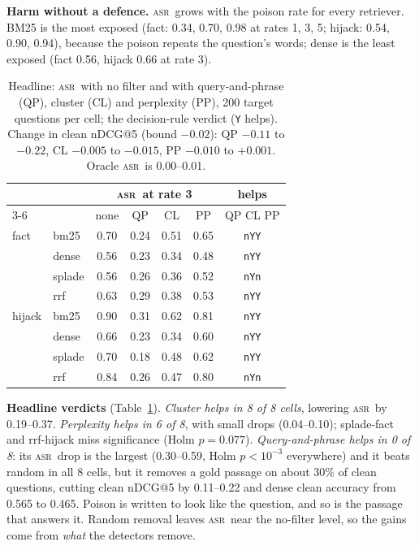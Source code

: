 \documentclass[10pt,a4paper,twocolumn]{article}
\makeatletter
\renewcommand\section{\@startsection{section}{1}{\z@}{-1.6ex plus -.4ex}{0.6ex}{\normalfont\large\bfseries}}
\newcommand{\asr}{\textsc{asr}}
\makeatother
\begin{document}
\section{Results}
\textbf{Harm without a defence.} \asr\ grows with the poison rate for every retriever. BM25 is the most exposed (fact: 0.34, 0.70, 0.98 at rates 1, 3, 5; hijack: 0.54, 0.90, 0.94), because the poison repeats the question's words; dense is the least exposed (fact 0.56, hijack 0.66 at rate 3).

\begin{table}[t]\centering\footnotesize
\setlength{\tabcolsep}{2.6pt}
\begin{tabular}{@{}llccccc@{}}
\toprule
 & & \multicolumn{4}{c}{\asr\ at rate 3} & helps \\
\cmidrule(lr){3-6}
 & & none & QP & CL & PP & \small QP CL PP \\
\midrule
fact & bm25 & 0.70 & 0.24 & 0.51 & 0.65 & \texttt{nYY} \\
 & dense & 0.56 & 0.23 & 0.34 & 0.48 & \texttt{nYY} \\
 & splade & 0.56 & 0.26 & 0.36 & 0.52 & \texttt{nYn} \\
 & rrf & 0.63 & 0.29 & 0.38 & 0.53 & \texttt{nYY} \\
\midrule
hijack & bm25 & 0.90 & 0.31 & 0.62 & 0.81 & \texttt{nYY} \\
 & dense & 0.66 & 0.23 & 0.34 & 0.60 & \texttt{nYY} \\
 & splade & 0.70 & 0.18 & 0.48 & 0.62 & \texttt{nYY} \\
 & rrf & 0.84 & 0.26 & 0.47 & 0.80 & \texttt{nYn} \\
\bottomrule
\end{tabular}
\caption{Headline: \asr\ with no filter and with query-and-phrase (QP), cluster (CL) and perplexity (PP), 200 target questions per cell; the decision-rule verdict (\texttt{Y} helps). Change in clean nDCG@5 (bound $-0.02$): QP $-0.11$ to $-0.22$, CL $-0.005$ to $-0.015$, PP $-0.010$ to $+0.001$. Oracle \asr\ is 0.00--0.01.}\label{tab:headline}
\end{table}

\textbf{Headline verdicts} (Table~\ref{tab:headline}). \emph{Cluster helps in 8 of 8 cells}, lowering \asr\ by 0.19--0.37. \emph{Perplexity helps in 6 of 8}, with small drops (0.04--0.10); splade-fact and rrf-hijack miss significance (Holm $p=0.077$). \emph{Query-and-phrase helps in 0 of 8}: its \asr\ drop is the largest (0.30--0.59, Holm $p<10^{-3}$ everywhere) and it beats random in all 8 cells, but it removes a gold passage on about 30\% of clean questions, cutting clean nDCG@5 by 0.11--0.22 and dense clean accuracy from 0.565 to 0.465. Poison is written to look like the question, and so is the passage that answers it. Random removal leaves \asr\ near the no-filter level, so the gains come from \emph{what} the detectors remove.
\end{document}
